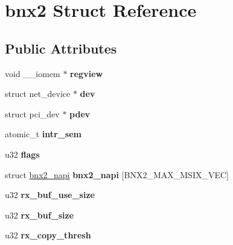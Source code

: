 \hypertarget{structbnx2}{
\section{bnx2 Struct Reference}
\label{structbnx2}
}
\subsection*{Public Attributes}
\begin{DoxyCompactItemize}
\item 
\hypertarget{structbnx2_a90d12b662eed75f62a7c4a481d55ab21}{
void \_\-\_\-iomem $\ast$ {\bfseries regview}}
\label{structbnx2_a90d12b662eed75f62a7c4a481d55ab21}

\item 
\hypertarget{structbnx2_aceeca7b6f5cff31dd21285edf1d423f5}{
struct net\_\-device $\ast$ {\bfseries dev}}
\label{structbnx2_aceeca7b6f5cff31dd21285edf1d423f5}

\item 
\hypertarget{structbnx2_a960ad8e2b1b74af6236c292d7af5e95f}{
struct pci\_\-dev $\ast$ {\bfseries pdev}}
\label{structbnx2_a960ad8e2b1b74af6236c292d7af5e95f}

\item 
\hypertarget{structbnx2_aa831876c77e0be78b440022af6ec9215}{
atomic\_\-t {\bfseries intr\_\-sem}}
\label{structbnx2_aa831876c77e0be78b440022af6ec9215}

\item 
\hypertarget{structbnx2_a5b7475ceda840f59a3a22b74f5e25868}{
u32 {\bfseries flags}}
\label{structbnx2_a5b7475ceda840f59a3a22b74f5e25868}

\item 
\hypertarget{structbnx2_adac4f7c05f6c1d521de8fa59e659fb6f}{
struct \hyperlink{structbnx2__napi}{bnx2\_\-napi} {\bfseries bnx2\_\-napi} \mbox{[}BNX2\_\-MAX\_\-MSIX\_\-VEC\mbox{]}}
\label{structbnx2_adac4f7c05f6c1d521de8fa59e659fb6f}

\item 
\hypertarget{structbnx2_ac0b07ff40a5f6f3ce949be20d2731475}{
u32 {\bfseries rx\_\-buf\_\-use\_\-size}}
\label{structbnx2_ac0b07ff40a5f6f3ce949be20d2731475}

\item 
\hypertarget{structbnx2_a05a05fe8d19bb0f65be2cd9d7d608756}{
u32 {\bfseries rx\_\-buf\_\-size}}
\label{structbnx2_a05a05fe8d19bb0f65be2cd9d7d608756}

\item 
\hypertarget{structbnx2_a2bb992f92519f32fb6c0b9bfc147444c}{
u32 {\bfseries rx\_\-copy\_\-thresh}}
\label{structbnx2_a2bb992f92519f32fb6c0b9bfc147444c}


\end{DoxyCompactItemize}
